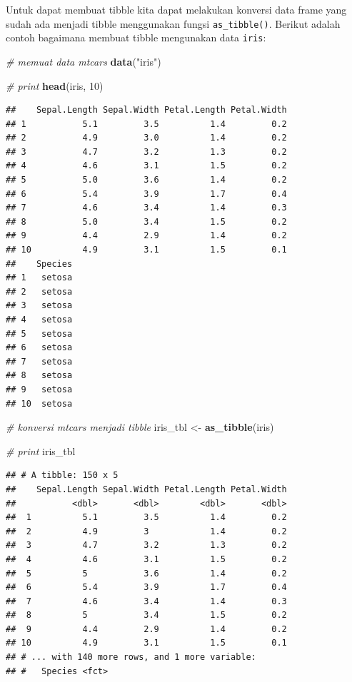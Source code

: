 \documentclass[]{book}
\newenvironment{Shaded}{\begin{snugshade}}{\end{snugshade}}
\newcommand{\KeywordTok}[1]{\textcolor[rgb]{0.13,0.29,0.53}{\textbf{#1}}}
\newcommand{\DecValTok}[1]{\textcolor[rgb]{0.00,0.00,0.81}{#1}}
\newcommand{\StringTok}[1]{\textcolor[rgb]{0.31,0.60,0.02}{#1}}
\newcommand{\CommentTok}[1]{\textcolor[rgb]{0.56,0.35,0.01}{\textit{#1}}}
\newcommand{\NormalTok}[1]{#1}
\begin{document}
Untuk dapat membuat tibble kita dapat melakukan konversi data frame yang
sudah ada menjadi tibble menggunakan fungsi \texttt{as\_tibble()}.
Berikut adalah contoh bagaimana membuat tibble mengunakan data
\texttt{iris}:

\begin{Shaded}
\begin{Highlighting}[]
\CommentTok{# memuat data mtcars}
\KeywordTok{data}\NormalTok{(}\StringTok{"iris"}\NormalTok{)}

\CommentTok{# print}
\KeywordTok{head}\NormalTok{(iris, }\DecValTok{10}\NormalTok{)}
\end{Highlighting}
\end{Shaded}

\begin{verbatim}
##    Sepal.Length Sepal.Width Petal.Length Petal.Width
## 1           5.1         3.5          1.4         0.2
## 2           4.9         3.0          1.4         0.2
## 3           4.7         3.2          1.3         0.2
## 4           4.6         3.1          1.5         0.2
## 5           5.0         3.6          1.4         0.2
## 6           5.4         3.9          1.7         0.4
## 7           4.6         3.4          1.4         0.3
## 8           5.0         3.4          1.5         0.2
## 9           4.4         2.9          1.4         0.2
## 10          4.9         3.1          1.5         0.1
##    Species
## 1   setosa
## 2   setosa
## 3   setosa
## 4   setosa
## 5   setosa
## 6   setosa
## 7   setosa
## 8   setosa
## 9   setosa
## 10  setosa
\end{verbatim}

\begin{Shaded}
\begin{Highlighting}[]
\CommentTok{# konversi mtcars menjadi tibble}
\NormalTok{iris_tbl <-}\StringTok{ }\KeywordTok{as_tibble}\NormalTok{(iris)}

\CommentTok{# print}
\NormalTok{iris_tbl}
\end{Highlighting}
\end{Shaded}

\begin{verbatim}
## # A tibble: 150 x 5
##    Sepal.Length Sepal.Width Petal.Length Petal.Width
##           <dbl>       <dbl>        <dbl>       <dbl>
##  1          5.1         3.5          1.4         0.2
##  2          4.9         3            1.4         0.2
##  3          4.7         3.2          1.3         0.2
##  4          4.6         3.1          1.5         0.2
##  5          5           3.6          1.4         0.2
##  6          5.4         3.9          1.7         0.4
##  7          4.6         3.4          1.4         0.3
##  8          5           3.4          1.5         0.2
##  9          4.4         2.9          1.4         0.2
## 10          4.9         3.1          1.5         0.1
## # ... with 140 more rows, and 1 more variable:
## #   Species <fct>
\end{verbatim}
\end{document}
